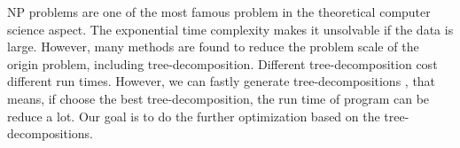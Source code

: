 NP problems are one of the most famous problem in the theoretical computer science aspect. The exponential time complexity makes it unsolvable if the data is large. However, many methods are found to reduce the problem scale of the origin problem, including tree-decomposition. Different tree-decomposition cost different run times. However, we can fastly generate tree-decompositions \cite{BHL1996LinearTreeDeomposition}, that means, if choose the best tree-decomposition, the run time of program can be reduce a lot. Our goal is to do the further optimization based on the tree-decompositions.